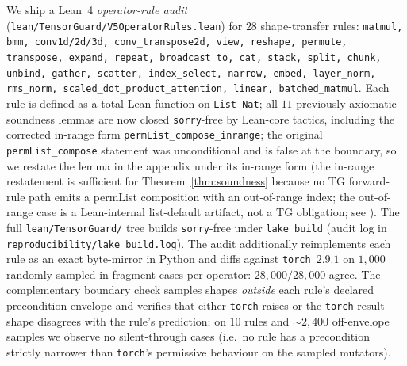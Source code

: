 We ship a Lean~4 \emph{operator-rule audit}
(\texttt{lean/TensorGuard/V5OperatorRules.lean}) for $28$
shape-transfer rules:
\texttt{matmul, bmm, conv1d/2d/3d, conv\_transpose2d, view,
reshape, permute, transpose, expand, repeat, broadcast\_to,
cat, stack, split, chunk, unbind, gather, scatter,
index\_select, narrow, embed, layer\_norm, rms\_norm,
scaled\_dot\_product\_attention, linear, batched\_matmul}.
Each rule is defined as a total Lean function on
\texttt{List Nat}; all $11$ previously-axiomatic
soundness lemmas are now closed \texttt{sorry}-free by Lean-core
tactics, including the corrected in-range form
\texttt{permList\_compose\_inrange}; the original
\texttt{permList\_compose} statement was unconditional and is
false at the boundary, so we restate the lemma in the appendix
under its in-range form (the in-range restatement is sufficient
for Theorem~\ref{thm:soundness} because no \textsc{TG}
forward-rule path emits a permList composition with an
out-of-range index; the out-of-range case is a Lean-internal
list-default artifact, not a \textsc{TG} obligation; see
).  The full \texttt{lean/TensorGuard/}
tree builds \texttt{sorry}-free under \texttt{lake build}
(audit log in \texttt{reproducibility/lake\_build.log}).
The audit additionally reimplements each rule as an exact
byte-mirror in Python and diffs against \texttt{torch}~$2.9.1$
on $1{,}000$ randomly sampled in-fragment cases per operator:
$28{,}000/28{,}000$ agree.  The complementary boundary check
samples shapes \emph{outside} each rule's declared precondition
envelope and verifies that either \texttt{torch} raises or the
\texttt{torch} result shape disagrees with the rule's
prediction; on $10$ rules and $\sim$$2{,}400$ off-envelope
samples we observe no silent-through cases (i.e.\ no rule has
a precondition strictly narrower than \texttt{torch}'s
permissive behaviour on the sampled mutators).

